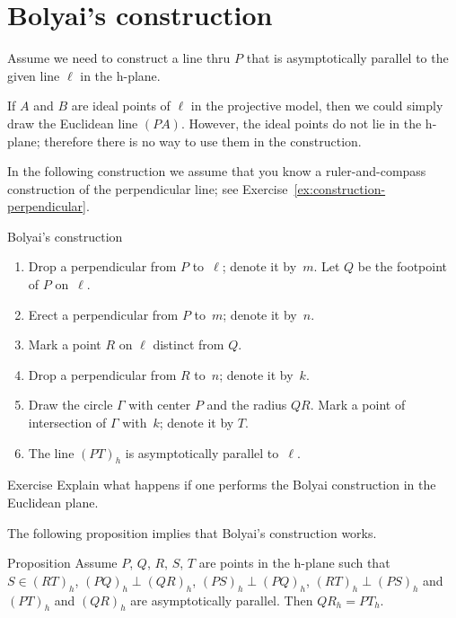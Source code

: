 \section{Bolyai's construction}

Assume we need to construct a line thru $P$ that is asymptotically parallel to the given line $\ell$ in the h-plane.

If $A$ and $B$ are ideal points of $\ell$ in the projective model, 
then we could simply draw the Euclidean line $(PA)$.
However, the ideal points do not lie in the h-plane; therefore there is no way to use them in the construction.

In the following construction we assume that you know a ruler-and-compass construction of the perpendicular line; see Exercise~\ref{ex:construction-perpendicular}.

\begin{thm}{Bolyai's construction}
\begin{enumerate}
\item Drop a perpendicular from $P$ to~$\ell$; denote it by~$m$.
Let $Q$ be the footpoint of $P$ on~$\ell$.
\item Erect a perpendicular from $P$ to~$m$; denote it by~$n$.
\item Mark a point $R$ on $\ell$ distinct from $Q$.
\item Drop a perpendicular from $R$ to~$n$; denote it by~$k$. 
\item Draw the circle $\Gamma$ with center $P$ and the radius $QR$. 
Mark a point of intersection of $\Gamma$ with~$k$; denote it by $T$.
\item The line $(PT)_h$ is asymptotically parallel to~$\ell$.
\end{enumerate}
\end{thm}

\begin{thm}{Exercise}\label{ex:Boyai-in-Euclid}
Explain what happens if one performs the Bolyai construction in the Euclidean plane.
\end{thm}

The following proposition implies that Bolyai's construction works.

\begin{thm}{Proposition}\label{prop:boyai}
Assume $P$, $Q$, $R$, $S$, $T$ are points in the h-plane
such that 
$S\in (RT)_h$,
$(PQ)_h\perp (QR)_h$,
$(PS)_h\perp(PQ)_h$,
$(RT)_h\perp (PS)_h$ and 
$(PT)_h$ and $(QR)_h$ are asymptotically parallel.
Then $QR_h=PT_h$.
\end{thm}


